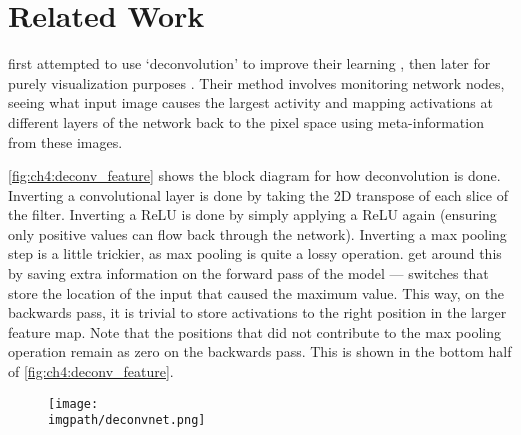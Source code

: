 \section{Related Work}
  \citeauthor{zeiler_adaptive_2011} first attempted to use `deconvolution' to
  improve their learning \cite{zeiler_adaptive_2011}, then later for purely
  visualization purposes \cite{zeiler_visualizing_2014}. Their method
  involves monitoring network nodes, seeing what input image causes the largest
  activity and mapping activations at different layers of the network back to the pixel
  space using meta-information from these images.
  
  \autoref{fig:ch4:deconv_feature} shows the block diagram for how deconvolution is
  done. Inverting a convolutional layer is done by taking the 2D transpose of each
  slice of the filter. Inverting a ReLU is done by simply applying a ReLU again
  (ensuring only positive values can flow back through the network).   
  Inverting
  a max pooling step is a little trickier, as max pooling is quite a lossy
  operation. \citeauthor{zeiler_adaptive_2011} get around this by saving extra
  information on the forward pass of the model --- switches that store the
  location of the input that caused the maximum value. This way, on the
  backwards pass, it is trivial to store activations to the right position in
  the larger feature map. Note that the positions that did not contribute to
  the max pooling operation remain as zero on the backwards pass. This is shown
  in the bottom half of \autoref{fig:ch4:deconv_feature}.

  \begin{figure}
    \centering
      \texttt{[image: \\imgpath/deconvnet.png]}
      \label{fig:ch4:deconv_feature}
  \end{figure}


